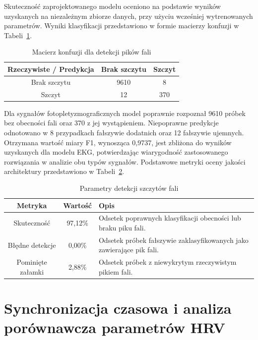 \documentclass[journal]{IEEEtran}
\begin{document}
\newpage
Skuteczność zaprojektowanego modelu oceniono na podstawie wyników uzyskanych na niezależnym zbiorze danych, przy użyciu wcześniej wytrenowanych parametrów. Wyniki klasyfikacji przedstawiono w formie macierzy konfuzji w Tabeli~\ref{tab:conf_matrix_ppg}.

\begin{table}[ht]
\centering
\caption{Macierz konfuzji dla detekcji pików fali}
\label{tab:conf_matrix_ppg}
\begin{tabular}{|c|c|c|}
\hline
\textbf{Rzeczywiste / Predykcja} & \textbf{Brak szczytu } & \textbf{Szczyt} \\
\hline
Brak szczytu  & 9610 & 8 \\
\hline
Szczyt  & 12 & 370 \\
\hline
\end{tabular}
\end{table}

Dla sygnałów fotopletyzmograficznych model poprawnie rozpoznał 9610 próbek bez obecności fali oraz 370 z jej wystąpieniem. Niepoprawne predykcje odnotowano w 8 przypadkach fałszywie dodatnich oraz 12  fałszywie ujemnych. Otrzymana wartość miary F1, wynosząca 0,9737, jest zbliżona do wyników uzyskanych dla modelu EKG, potwierdzając wiarygodność zastosowanego rozwiązania w analizie obu typów sygnałów.
Podstawowe metryki oceny jakości architektury przedstawiono w Tabeli~\ref{tab:metrics_ppg}.

\begin{table}[ht]
\centering
\caption{Parametry detekcji szczytów fali}
\label{tab:metrics_ppg}
\begin{tabular}{|c|c|p{4.6cm}|}
\hline
\textbf{Metryka} & \textbf{Wartość} & \textbf{Opis} \\
\hline
Skuteczność & 97,12\% & Odsetek poprawnych klasyfikacji obecności lub braku piku fali. \\
\hline
Błędne detekcje & 0,00\% & Odsetek próbek fałszywie zaklasyfikowanych jako zawierające pik fali. \\
\hline
Pominięte załamki & 2,88\% & Odsetek próbek z niewykrytym rzeczywistym pikiem fali. \\
\hline
\end{tabular}
\end{table}

\section{Synchronizacja czasowa i analiza porównawcza parametrów HRV}
\end{document}
